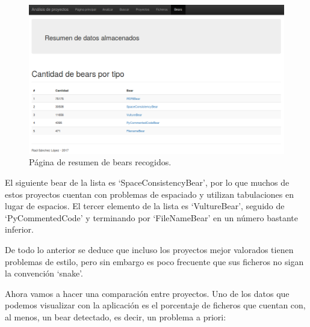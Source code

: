 \documentclass[a4paper, 12pt]{book}
\begin{document}
\begin{figure}[H]
  \centering
  \includegraphics[width=15cm, keepaspectratio]{img/resultadosBear}
  \caption{Página de resumen de bears recogidos.}
  \label{fig:resultadosBear}
\end{figure}

El siguiente bear de la lista es `SpaceConsistencyBear', por lo que muchos de estos proyectos cuentan con problemas de espaciado y utilizan tabulaciones en lugar de espacios. El tercer elemento de la lista es `VultureBear', seguido de `PyCommentedCode' y terminando por `FileNameBear' en un número bastante inferior.

De todo lo anterior se deduce que incluso los proyectos mejor valorados tienen problemas de estilo, pero sin embargo es poco frecuente que sus ficheros no sigan la convención `snake'.

Ahora vamos a hacer una comparación entre proyectos. Uno de los datos que podemos visualizar con la aplicación es el porcentaje de ficheros que cuentan con, al menos, un bear detectado, es decir, un problema a priori:
\end{document}
